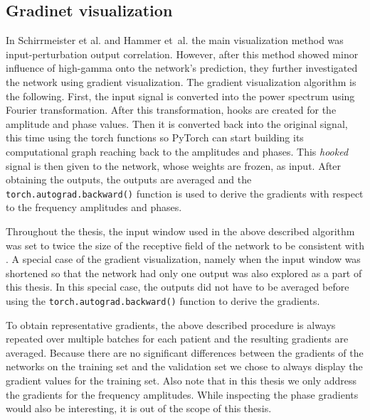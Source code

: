 \subsection{Gradinet visualization}\label{subsec:gradinet-visualization}
In Schirrmeister et al. and Hammer et\ al. the main visualization method was input-perturbation output correlation.
However, after this method showed minor influence of high-gamma onto the network's prediction, they further investigated the network using gradient visualization.
The gradient visualization algorithm is the following.
First, the input signal is converted into the power spectrum using Fourier transformation.
After this transformation, hooks are created for the amplitude and phase values.
Then it is converted back into the original signal, this time using the torch functions so PyTorch can start building its computational graph reaching back to the amplitudes and phases.
This \textit{hooked} signal is then given to the network, whose weights are frozen, as input.
After obtaining the outputs, the outputs are averaged and the \texttt{torch.autograd.backward()} function is used to derive the gradients with respect to the frequency amplitudes and phases.

Throughout the thesis, the input window used in the above described algorithm was set to twice the size of the receptive field of the network to be consistent with \cite{Hammer_2021}.
A special case of the gradient visualization, namely when the input window was shortened so that the network had only one output was also explored as a part of this thesis.
In this special case, the outputs did not have to be averaged before using the \texttt{torch.autograd.backward()} function to derive the gradients.

To obtain representative gradients, the above described procedure is always repeated over multiple batches for each patient and the resulting gradients are averaged.
Because there are no significant differences between the gradients of the networks on the training set and the validation set we chose to always display the gradient values for the training set.
Also note that in this thesis we only address the gradients for the frequency amplitudes.
While inspecting the phase gradients would also be interesting, it is out of the scope of this thesis.


